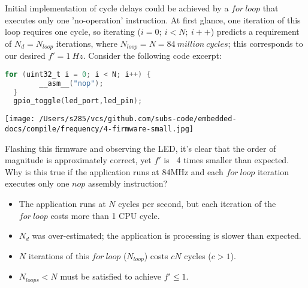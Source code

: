 \documentclass[a4paper,12pt]{article}   	%
\begin{document}
\large
\begin{flushleft}
Initial implementation of cycle delays could be achieved by a 
$for\ loop$ that executes only one 'no-operation' instruction. At first 
glance, one iteration of this loop requires one cycle, so iterating ($i = 0;\ i < N;\ i++$)
predicts a requirement of $N_d = N_{loop}$ iterations, where $N_{loop} = N = 84\ million\ cycles$;
this corresponds to our desired $f'= 1\ Hz$.
Consider the following code excerpt:\\[1 ex] 

\begin{lstlisting}[backgroundcolor = \color{beige},
                    language = C,
                    xleftmargin = 1cm,
                    framexleftmargin = 1em]
  for (uint32_t i = 0; i < N; i++) {
        __asm__("nop");
  }
  gpio_toggle(led_port,led_pin);
  \end{lstlisting}
  
\begin{center}
    \texttt{[image: /Users/s285/vcs/github.com/subs-code/embedded-docs/compile/frequency/4-firmware-small.jpg]}
\end{center}

Flashing this firmware and
observing the LED, it's clear that the order of magnitude is approximately correct, 
yet $f'$ is ~4 times smaller than expected. Why is this true 
if the application runs at 84MHz and each $for\ loop$ iteration executes only one $nop$ assembly instruction?\\[1 ex]

\end{flushleft}
\begin{itemize}
\setlength{\itemindent}{0.4in}
    \item The application runs at $N$ cycles per second, 
    but each iteration of the $for\ loop$ costs more than 1 CPU cycle. 
    \item $N_d$ was over-estimated; the application is processing is slower than expected.
    \item $N$ iterations of this $for\ loop$ ($N_{loop}$) costs $cN$ cycles ($c > 1$).
    \item $N_{loops} < N$ must be satisfied to achieve $f' \le 1.$
\end{itemize}
\end{document}
